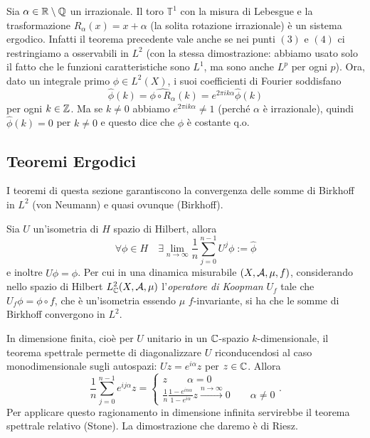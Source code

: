 \begin{esempio}Sia $\alpha\in\mathbb{R}\setminus\mathbb{Q}$ un irrazionale. Il toro $\mathbb{T}^1$
con la misura di Lebesgue e la trasformazione $R_\alpha(x)=x+\alpha$ (la solita rotazione irrazionale)
è un sistema ergodico. Infatti il teorema precedente vale anche se nei punti $(3)$ e $(4)$ ci restringiamo a osservabili in $L^2$
(con la stessa dimostrazione: abbiamo usato solo il fatto che le funzioni caratteristiche sono $L^1$, ma
sono anche $L^p$ per ogni $p$). Ora, dato un integrale primo $\phi\in L^2(X)$, i suoi coefficienti di Fourier soddisfano
\[ \widehat{\phi}(k)=\widehat{\phi\circ R_\alpha}(k)=e^{2\pi i k\alpha}\widehat{\phi}(k) \]
per ogni $k\in\mathbb{Z}$. Ma se $k\neq 0$ abbiamo $e^{2\pi i k\alpha}\neq 1$ (perché $\alpha$ è irrazionale), quindi
$\widehat{\phi}(k)=0$ per $k\neq 0$ e questo dice che $\phi$ è costante q.o.
\end{esempio}




\subsection{Teoremi Ergodici}

I teoremi di questa sezione garantiscono la convergenza delle somme di Birkhoff in $L^2$ (von Neumann) e quasi ovunque (Birkhoff).

\begin{teo} Sia $U$ un'isometria di $H$ spazio di Hilbert, allora
 \[\forall\phi\in H \quad \exists \lim_{n\rightarrow\infty}\frac{1}{n}\sum_{j=0}^{n-1}U^j\phi:=\hat\phi\]
 e inoltre $U\hat\phi=\phi$. Per cui in una dinamica misurabile $(X,\mathcal{A},\mu,f)$, considerando nello spazio di Hilbert $L^2_{\mathbb{C}}(X,\mathcal{A},\mu)$ l'\emph{operatore di Koopman} $U_f$ tale che $U_f \phi=\phi\circ f$, che è un'isometria essendo $\mu$ $f$-invariante, si ha che le somme di Birkhoff convergono in $L^2$. 
 \end{teo}

\begin{oss}
 In dimensione finita, cioè per $U$ unitario in un $\mathbb{C}$-spazio $k$-dimensionale, il teorema spettrale permette di diagonalizzare $U$ riconducendosi al caso monodimensionale sugli autospazi: $Uz=e^{i\alpha}z$ per $z\in\mathbb{C}$. Allora
 \[\frac{1}{n}\sum_{j=0}^{n-1}e^{ij\alpha}z=\begin{cases} z \qquad \alpha=0 \\ \frac{1}{n}\frac{1-e^{in\alpha}}{1-e^{i\alpha}}z \overset{n\rightarrow\infty}{\longrightarrow}0 \qquad \alpha\neq 0\end{cases}   .                                                                                                                                                                                            \]
 Per applicare questo ragionamento in dimensione infinita servirebbe il teorema spettrale relativo (Stone). La dimostrazione che daremo è di Riesz.
\end{oss}

